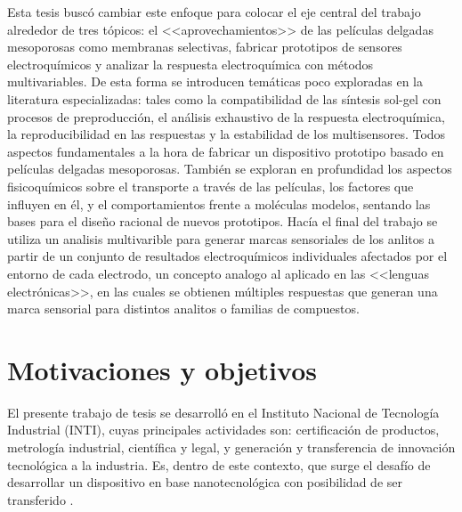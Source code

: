 	Esta tesis buscó cambiar este enfoque para colocar el eje central del trabajo alrededor de tres tópicos: el <<aprovechamientos>> de las películas delgadas mesoporosas como membranas selectivas, fabricar prototipos de sensores electroquímicos y analizar la respuesta electroquímica con métodos multivariables. De esta forma se introducen temáticas poco exploradas en la literatura especializadas: tales como la compatibilidad de las síntesis sol-gel con procesos de preproducción, el análisis exhaustivo de la respuesta electroquímica, la reproducibilidad en las respuestas y la estabilidad de los multisensores. Todos aspectos fundamentales a la hora de fabricar un dispositivo prototipo basado en películas delgadas mesoporosas. También se exploran en profundidad los aspectos fisicoquímicos sobre el transporte a través de las películas, los factores que influyen en él, y el comportamientos frente a moléculas modelos, sentando las bases para el diseño racional de nuevos prototipos. Hacía el final del trabajo se utiliza un analisis multivarible para generar marcas sensoriales de los anlitos a partir de un conjunto de resultados electroquímicos individuales afectados por el entorno de cada electrodo, un concepto analogo al aplicado en las <<lenguas electrónicas>>,\cite{Ciosek2007,mimendia2010,tahara2013} en las cuales se obtienen múltiples respuestas que generan una marca sensorial para distintos analitos o familias de compuestos.






	




 		    	
\section{Motivaciones y objetivos}

	El presente trabajo de tesis se desarrolló en el Instituto Nacional de Tecnología Industrial (INTI), cuyas principales actividades son: certificación de productos, metrología industrial, científica y legal, y generación y transferencia	de innovación tecnológica a la industria. Es, dentro de este contexto, que surge el desafío de desarrollar un dispositivo en base nanotecnológica con posibilidad de ser transferido . 

